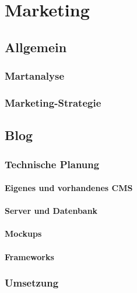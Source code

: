 \chapter{Marketing}
\renewcommand{\kapitelautor}{Autor: Markus Kaiser}

\section{Allgemein}

  \subsection{Martanalyse}

  \subsection{Marketing-Strategie}

\section{Blog}

  \subsection{Technische Planung}

    \subsubsection{Eigenes und vorhandenes CMS}

    \subsubsection{Server und Datenbank}

    \subsubsection{Mockups}

    \subsubsection{Frameworks}

  \subsection{Umsetzung}


